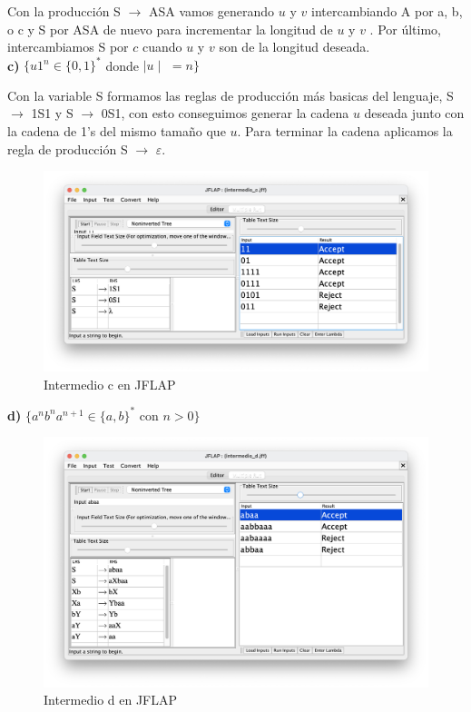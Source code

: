 Con la producción S $\rightarrow$ ASA vamos generando $u$ y $v$  intercambiando A por a, b, o c y S por ASA de nuevo para incrementar la longitud de $u$ y $v$ . Por último,
intercambiamos S por $c$ cuando $u$ y $v$  son de la longitud deseada. \\

\textbf{c)}  $\{ u1^{n} \in \{0,1\}^{\ast} $ donde $\mid u \mid$ $= n \}$

Con la variable S formamos las reglas de producción más basicas del lenguaje, S $\rightarrow$ 1S1 y S $\rightarrow$ 0S1, con esto conseguimos generar la cadena $u$ deseada 
junto con la cadena de 1's del mismo tamaño que $u$. Para terminar la cadena aplicamos la regla de producción S $\rightarrow$ $\varepsilon$.
 
\begin{figure}[H] 
	\centering
	\includegraphics[scale=0.35]{../practica_1/images/intermedio_c.png} 
	\caption{Intermedio c en JFLAP} 
    \label{fig:intermedio_c}
\end{figure}

\textbf{d)}  $\{ a^{n} b^{n} a^{n+1} \in \{a,b\}^{\ast}$ con $n > 0\}$

\begin{figure}[H] 
	\centering
	\includegraphics[scale=0.35]{../practica_1/images/intermedio_d.png} 
	\caption{Intermedio d en JFLAP} 
    \label{fig:intermedio_d}
\end{figure}

